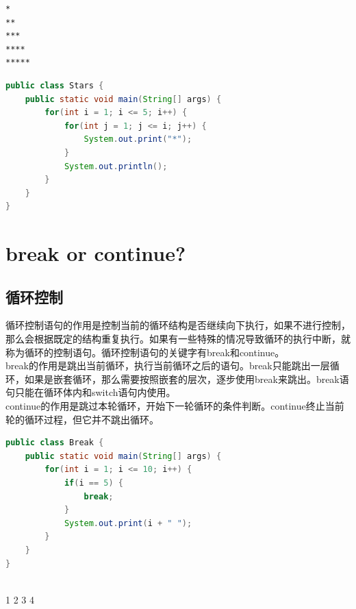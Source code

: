 \vspace{0.5cm}


\begin{lstlisting}
*
**
***
****
*****
\end{lstlisting}

\begin{lstlisting}[language=Java]
public class Stars {
    public static void main(String[] args) {
        for(int i = 1; i <= 5; i++) {
            for(int j = 1; j <= i; j++) {
                System.out.print("*");
            }
            System.out.println();
        }
    }
}
\end{lstlisting}

\newpage

\section{break or continue?}

\subsection{循环控制}

循环控制语句的作用是控制当前的循环结构是否继续向下执行，如果不进行控制，那么会根据既定的结构重复执行。如果有一些特殊的情况导致循环的执行中断，就称为循环的控制语句。循环控制语句的关键字有break和continue。 \\

break的作用是跳出当前循环，执行当前循环之后的语句。break只能跳出一层循环，如果是嵌套循环，那么需要按照嵌套的层次，逐步使用break来跳出。break语句只能在循环体内和switch语句内使用。 \\

continue的作用是跳过本轮循环，开始下一轮循环的条件判断。continue终止当前轮的循环过程，但它并不跳出循环。 \\


\begin{lstlisting}[language=Java]
public class Break {
    public static void main(String[] args) {
        for(int i = 1; i <= 10; i++) {
            if(i == 5) {
                break;
            }
            System.out.print(i + " ");
        }
    }
}
\end{lstlisting}

\begin{tcolorbox}
	 \\
	1 2 3 4
\end{tcolorbox}

